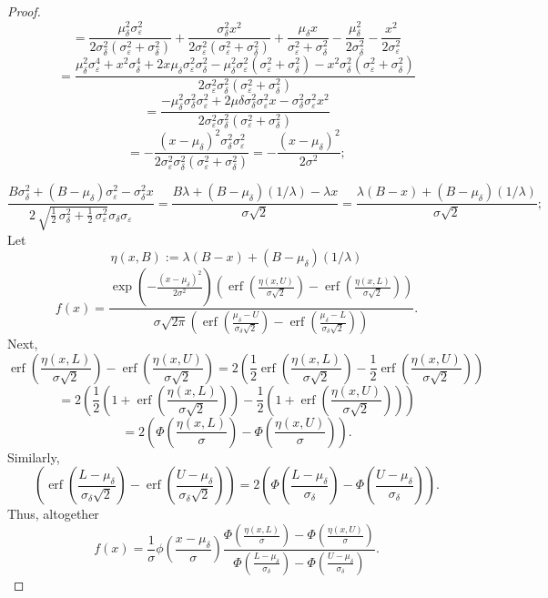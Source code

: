 \documentclass{article}
\newcommand{\ep}{\varepsilon}
\newcommand{\erf}{\operatorname{erf}}
\begin{document}
\begin{proof}
	$$= \frac{\mu_\delta^2 \sigma_\ep^2}{2\sigma_\delta^2(\sigma_\ep^2 + \sigma_\delta^2)} + \frac{\sigma_\delta^2 x^2}{2\sigma_\ep^2(\sigma_\ep^2 + \sigma_\delta^2)} + \frac{\mu_\delta x}{\sigma_\ep^2 + \sigma_\delta^2} - \frac{\mu_\delta^2}{2\sigma_\delta^2} - \frac{x^2}{2\sigma_\ep^2}$$
	$$= \frac{\mu_\delta^2 \sigma_\ep^4 + x^2 \sigma_\delta^4 + 2x \mu_\delta \sigma_\ep^2 \sigma_\delta^2 - \mu_\delta^2\sigma_\ep^2(\sigma_\ep^2 + \sigma_\delta^2) - x^2\sigma_\delta^2(\sigma_\ep^2 + \sigma_\delta^2)}{2\sigma_\ep^2 \sigma_\delta^2 (\sigma_\ep^2 + \sigma_\delta^2)}$$
	$$= \frac{-\mu_\delta^2\sigma_\delta^2\sigma_\ep^2 + 2\mu\delta\sigma_\delta^2\sigma_\ep^2 x - \sigma_\delta^2\sigma_\ep^2 x^2}{2\sigma_\ep^2 \sigma_\delta^2 (\sigma_\ep^2 + \sigma_\delta^2)}$$
	$$= -\frac{(x - \mu_\delta)^2 \sigma_\delta^2 \sigma_\ep^2}{2\sigma_\ep^2 \sigma_\delta^2 (\sigma_\ep^2 + \sigma_\delta^2)} = -\frac{(x - \mu_\delta)^2}{2\sigma^2};$$
	
	$$\frac{B \sigma_{\delta}^{2} + {\left(B - \mu_{\delta}\right)} \sigma_{\ep}^{2} - \sigma_{\delta}^{2} x}{2 \, \sqrt{\frac{1}{2} \, \sigma_{\delta}^{2} + \frac{1}{2} \, \sigma_{\ep}^{2}} \sigma_{\delta} \sigma_{\ep}} = \frac{B\lambda + (B - \mu_\delta) (1 / \lambda) - \lambda x}{\sigma \sqrt{2}} = \frac{\lambda (B - x) + (B - \mu_\delta) (1 / \lambda)}{\sigma \sqrt{2}};$$
	Let
	$$\eta(x, B) := \lambda (B - x) + (B - \mu_\delta) (1 / \lambda)$$
	$$f(x) = \frac{\exp\left(-\frac{(x - \mu_\delta)^2}{2\sigma^2}\right) \left(\erf\left(\frac{\eta(x, U)}{\sigma \sqrt{2}}\right) - \erf\left(\frac{\eta(x, L)}{\sigma \sqrt{2}}\right)\right)}{\sigma\sqrt{2\pi}\left(\erf\left(\frac{\mu_\delta - U}{\sigma_\delta\sqrt{2}}\right) - \erf\left(\frac{\mu_\delta - L}{\sigma_\delta\sqrt{2}}\right)\right)}.$$
	Next,
	$$\erf\left(\frac{\eta(x, L)}{\sigma \sqrt{2}}\right) - \erf\left(\frac{\eta(x, U)}{\sigma \sqrt{2}}\right) = 2\left(\frac12 \erf\left(\frac{\eta(x, L)}{\sigma \sqrt{2}}\right) - \frac12\erf\left(\frac{\eta(x, U)}{\sigma \sqrt{2}}\right)\right)$$
	$$= 2\left(\frac12 \left(1 + \erf\left(\frac{\eta(x, L)}{\sigma \sqrt{2}}\right)\right) - \frac12 \left(1 + \erf\left(\frac{\eta(x, U)}{\sigma \sqrt{2}}\right)\right)\right)$$
	$$= 2\left(\Phi\left(\frac{\eta(x, L)}{\sigma}\right) - \Phi\left(\frac{\eta(x, U)}{\sigma}\right)\right).$$
	Similarly,
	$$\left(\erf\left(\frac{L - \mu_\delta}{\sigma_\delta\sqrt{2}}\right) - \erf\left(\frac{U - \mu_\delta}{\sigma_\delta\sqrt{2}}\right)\right) = 2\left(\Phi\left(\frac{L - \mu_\delta}{\sigma_\delta}\right) - \Phi\left(\frac{U - \mu_\delta}{\sigma_\delta}\right)\right).$$
	Thus, altogether
	$$f(x) = \frac{1}{\sigma}\phi\left(\frac{x - \mu_\delta}{\sigma}\right) \frac{\Phi\left(\frac{\eta(x, L)}{\sigma}\right) - \Phi\left(\frac{\eta(x, U)}{\sigma}\right)}{\Phi\left(\frac{L - \mu_\delta}{\sigma_\delta}\right) - \Phi\left(\frac{U - \mu_\delta}{\sigma_\delta}\right)}.$$
\end{proof}
\end{document}
